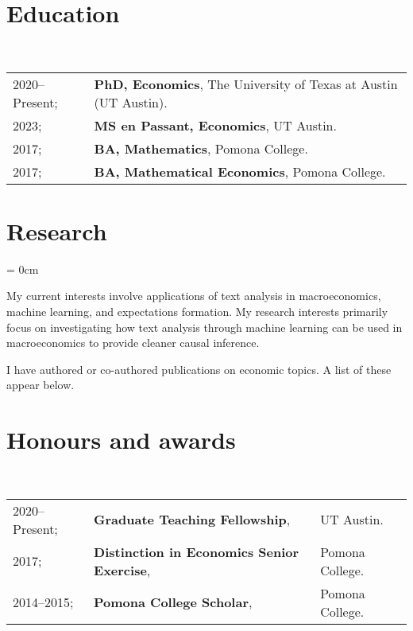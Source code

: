 \documentclass[a4paper, 10pt]{article}
\begin{document}
  \maketitle
  \thispagestyle{firststyle}
  \section{Education}
  ~\begin{tabular}{ll}
    2020--Present; & \textbf{PhD, Economics}, The University of Texas at Austin (UT Austin).\\
    2023; & \textbf{MS en Passant, Economics}, UT Austin.\\
    2017; & \textbf{BA, Mathematics}, Pomona College.\\
    2017; & \textbf{BA, Mathematical Economics}, Pomona College.\\
  \end{tabular}
  \vspace*{0.25em}

  \section{Research}
  \begin{compactitem}\parskip = 0cm
    \item My current interests involve applications of text analysis in macroeconomics, machine learning, and expectations formation. My research interests primarily focus on investigating how text analysis through machine learning can be used in macroeconomics to provide cleaner causal inference.
    \item I have authored or co-authored  publications on economic topics. A list of these appear below.
  \end{compactitem}
  \vspace*{0.25em}

  \vspace*{-0.75em}
  \begin{publications}
  \end{publications}
  \vspace*{-0.75em}

  \section{Honours and awards}
  ~\begin{tabular}{lll}
    2020--Present; & \textbf{Graduate Teaching Fellowship}, & UT Austin.\\
    2017; & \textbf{Distinction in Economics Senior Exercise}, & Pomona College.\\
    2014--2015; & \textbf{Pomona College Scholar}, & Pomona College.
  \end{tabular}
  \vspace*{0.25em}
\end{document}
